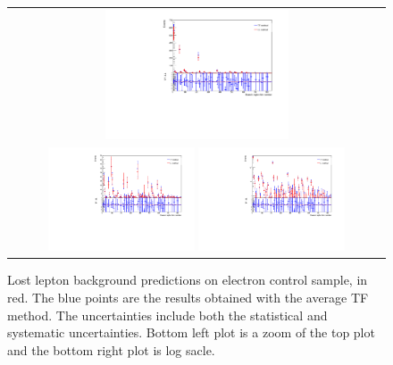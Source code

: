 \begin{figure}[hptb]
\begin{center}
\begin{tabular}{c}
\includegraphics[width=0.50\textwidth]{sections/mc4/Backgrounds/LostLepton/figures/v4_DataCardCampare_0_700_el_cs.pdf}\\
\includegraphics[width=0.40\textwidth]{sections/mc4/Backgrounds/LostLepton/figures/v4_DataCardCampare_0_50_el_cs.pdf}
\includegraphics[width=0.40\textwidth]{sections/mc4/Backgrounds/LostLepton/figures/v4_DataCardCampare_0_700_el_cs_log.pdf}
\end{tabular}
\end{center}
\caption{Lost lepton background predictions on electron control sample, in red. The blue points are the results obtained with the average TF method. The uncertainties include both the statistical and systematic uncertainties. Bottom left plot is a zoom of the top plot and the bottom right plot is log sacle.}
\label{fig:LostLeptonResult_el}
\end{figure}

